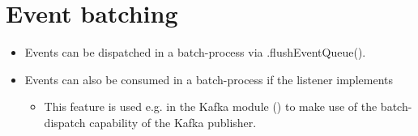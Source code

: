 \section{Event batching}
\label{feature:EventBatching}
\ClearAPI
\begin{itemize}
	\item Events can be dispatched in a batch-process via .flushEventQueue().
	\item Events can also be consumed in a batch-process if the listener implements 
	\begin{itemize}
		\item This feature is used e.g. in the  Kafka module () to make use of the batch-dispatch capability of the Kafka publisher.
	\end{itemize}
\end{itemize}

